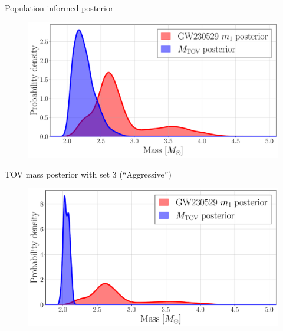 \documentclass[usenames,dvipsnames,t]{beamer}
\begin{document}
\begin{frame}{Population informed posterior}

  \begin{figure}
    \centering
    \includegraphics[width=0.9\linewidth]{Figures/mtov_gw230529_set_L1_pdb.pdf}
  \end{figure}    

\end{frame}

\begin{frame}{TOV mass posterior with set 3 (``Aggressive'')}

  \begin{figure}
    \centering
    \includegraphics[width=0.75\linewidth]{Figures/mtov_gw230529_set_L3_pdb.pdf}
  \end{figure}

\end{frame}
\end{document}
